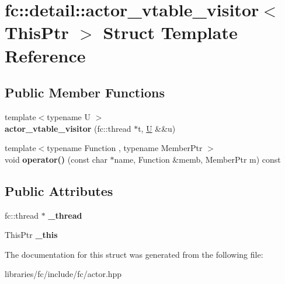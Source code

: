 \hypertarget{structfc_1_1detail_1_1actor__vtable__visitor}{}\section{fc\+:\+:detail\+:\+:actor\+\_\+vtable\+\_\+visitor$<$ This\+Ptr $>$ Struct Template Reference}
\label{structfc_1_1detail_1_1actor__vtable__visitor}
\subsection*{Public Member Functions}
\begin{DoxyCompactItemize}
\item 
\mbox{\label{structfc_1_1detail_1_1actor__vtable__visitor_a9a55fc5c21e4d994d7839db4b2095bb7}} 
{\footnotesize template$<$typename U $>$ }\\{\bfseries actor\+\_\+vtable\+\_\+visitor} (fc\+::thread $\ast$t, \mbox{\hyperlink{union_u}{U}} \&\&u)
\item 
\mbox{\label{structfc_1_1detail_1_1actor__vtable__visitor_a69b200fad555a154df4bbb758144a478}} 
{\footnotesize template$<$typename Function , typename Member\+Ptr $>$ }\\void {\bfseries operator()} (const char $\ast$name, Function \&memb, Member\+Ptr m) const
\end{DoxyCompactItemize}
\subsection*{Public Attributes}
\begin{DoxyCompactItemize}
\item 
\mbox{\label{structfc_1_1detail_1_1actor__vtable__visitor_abcd3fa0772477177db2d689dc819a9f5}} 
fc\+::thread $\ast$ {\bfseries \+\_\+thread}
\item 
\mbox{\label{structfc_1_1detail_1_1actor__vtable__visitor_a845f7dc3fb69779853797d73c8b66227}} 
This\+Ptr {\bfseries \+\_\+this}
\end{DoxyCompactItemize}


The documentation for this struct was generated from the following file\+:\begin{DoxyCompactItemize}
\item 
libraries/fc/include/fc/actor.\+hpp\end{DoxyCompactItemize}
